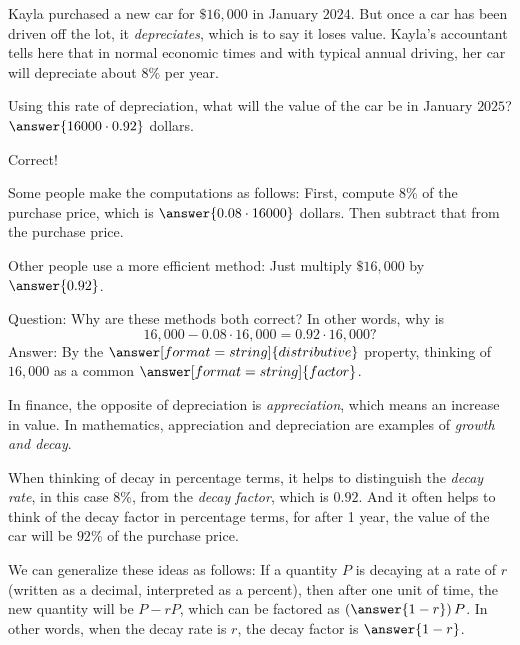 \documentclass[nooutcomes]{ximera}
\begin{document}
\begin{problem}
Kayla purchased a new car for $\$16,\!000$ in January $2024$.  But once a car has been driven off the lot, it \emph{depreciates}, which is to say it loses value.  Kayla's accountant tells here that in normal economic times and with typical annual driving, her car will depreciate about $8\%$ per year.  

Using this rate of depreciation, what will the value of the car be in January $2025$?  $\answer{16000\cdot 0.92}$ dollars.  
\begin{problem}
Correct!  

Some people make the computations as follows:  First, compute $8\%$ of the purchase price, which is $\answer{0.08\cdot 16000}$ dollars.  Then subtract that from the purchase price.  

Other people use a more efficient method:  Just multiply $\$16,\!000$ by $\answer{0.92}$.  

\begin{problem}
Question: Why are these methods both correct?  In other words, why is  
\[
16,\!000 - 0.08\cdot 16,\!000 = 0.92 \cdot 16,\!000?  
\]
Answer: By the $\answer[format=string]{distributive}$ property, thinking of $16,\!000$ as a common $\answer[format=string]{factor}$. 

\begin{problem}
In finance, the opposite of depreciation is \emph{appreciation}, which means an increase in value.  In mathematics, appreciation and depreciation are examples of \emph{growth and decay}. 
 
When thinking of decay in percentage terms, it helps to distinguish the \emph{decay rate}, in this case $8\%$, from the 
\emph{decay factor}, which is $0.92$.  And it often helps to think of the decay factor in percentage terms, for after 1 year, 
the value of the car will be $92\%$ of the purchase price.  

We can generalize these ideas as follows:  If a quantity $P$ is decaying at a rate of $r$ (written as a decimal, interpreted as a percent), then after one unit of time, the 
new quantity will be $P - rP$, which can be factored as $\left(\answer{1-r}\right)P$.  In other words, when the decay rate is $r$, the decay factor is $\answer{1-r}$.  

\end{problem}
\end{problem}
\end{problem}
\end{problem}
\end{document}
